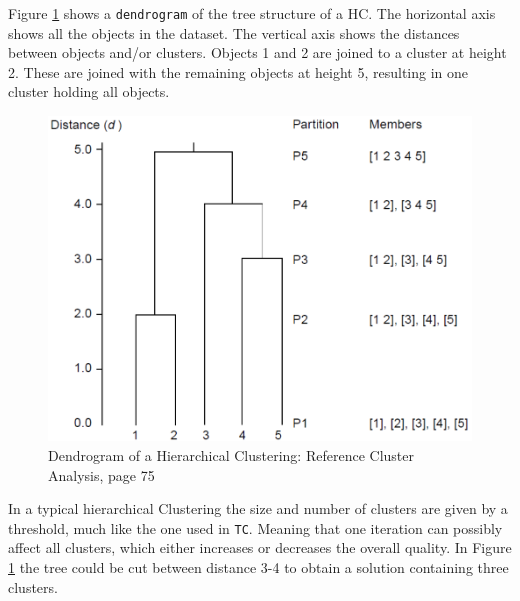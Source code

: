 \documentclass[a4paper,10pt]{article}
\theoremstyle{plain}
\theoremstyle{definition}
\begin{document}
Figure \ref{fig:hc example} shows a \texttt{dendrogram} of the tree structure of a HC. The horizontal axis shows all the objects in the dataset. The vertical axis shows the distances between objects and/or clusters. Objects 1 and 2 are joined to a cluster at height 2. These are joined with the remaining objects at height 5, resulting in one cluster holding all objects.
\begin{figure}[H]
	\centering
	\includegraphics*[scale=0.3]{./pictures/hc/hc_example.png}
	\caption{Dendrogram of a Hierarchical Clustering: Reference Cluster Analysis, page 75}
	\label{fig:hc example}
\end{figure}

In a typical hierarchical Clustering the size and number of clusters are given by a threshold, much like the one used in \texttt{TC}. Meaning that one iteration can possibly affect all clusters, which either increases or decreases the overall quality. In Figure \ref{fig:hc example} the tree could be cut between distance 3-4 to obtain a solution containing three clusters.

\end{document}
